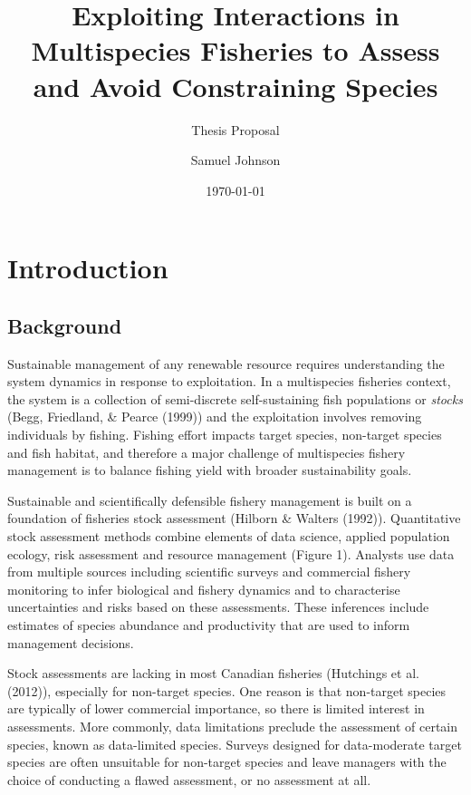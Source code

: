 \documentclass[12pt,]{scrartcl}
\title{Exploiting Interactions in Multispecies Fisheries to Assess and Avoid
Constraining Species}
\subtitle{Thesis Proposal}
\author{Samuel Johnson}
\date{\today}
\begin{document}
\maketitle





\newpage

{
\hypersetup{linkcolor=black}
\setcounter{tocdepth}{3}
\tableofcontents
}
\section{Introduction}\label{introduction}

\subsection{Background}\label{background}

Sustainable management of any renewable resource requires understanding
the system dynamics in response to exploitation. In a multispecies
fisheries context, the system is a collection of semi-discrete
self-sustaining fish populations or \emph{stocks} (Begg, Friedland, \&
Pearce (1999)) and the exploitation involves removing individuals by
fishing. Fishing effort impacts target species, non-target species and
fish habitat, and therefore a major challenge of multispecies fishery
management is to balance fishing yield with broader sustainability
goals.

Sustainable and scientifically defensible fishery management is built on
a foundation of fisheries stock assessment (Hilborn \& Walters (1992)).
Quantitative stock assessment methods combine elements of data science,
applied population ecology, risk assessment and resource management
(Figure 1). Analysts use data from multiple sources including scientific
surveys and commercial fishery monitoring to infer biological and
fishery dynamics and to characterise uncertainties and risks based on
these assessments. These inferences include estimates of species
abundance and productivity that are used to inform management decisions.

Stock assessments are lacking in most Canadian fisheries (Hutchings et
al. (2012)), especially for non-target species. One reason is that
non-target species are typically of lower commercial importance, so
there is limited interest in assessments. More commonly, data
limitations preclude the assessment of certain species, known as
data-limited species. Surveys designed for data-moderate target species
are often unsuitable for non-target species and leave managers with the
choice of conducting a flawed assessment, or no assessment at all.
\end{document}
